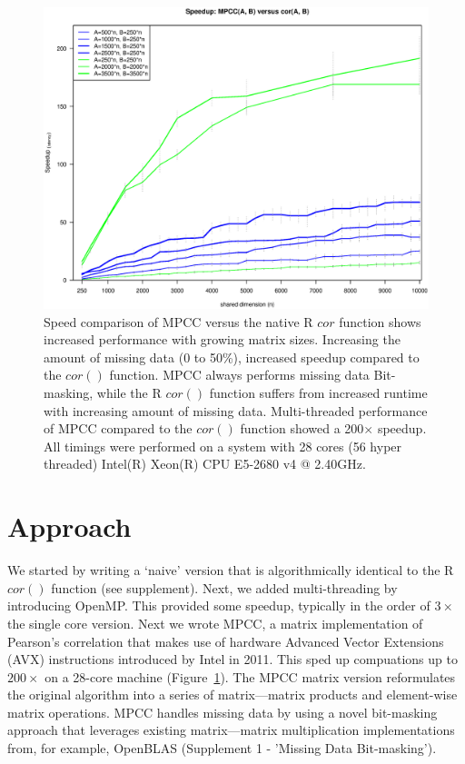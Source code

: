 \documentclass{bioinfo}
\begin{document}
\begin{figure}[H]
\centering
\includegraphics[width=\linewidth]{img/figure02new.eps}
  \caption{
  \small
    Speed comparison of MPCC versus the native R $cor$ function
    shows increased performance with growing matrix sizes. Increasing
    the amount of missing data (0 to 50\%), increased speedup compared
    to the $cor()$ function. MPCC always performs missing data Bit-masking,
    while the R $cor()$ function suffers from increased runtime with
    increasing amount of missing data. Multi-threaded performance
    of MPCC compared to the $cor()$ function showed a 200$\times$ speedup.
    All timings were performed on a system with 28 cores (56 hyper
    threaded) Intel(R) Xeon(R) CPU E5-2680 v4 @ 2.40GHz.
}
  \label{fig:fig2}
\end{figure}

\vspace*{-10mm}

\section{Approach}

We started by writing a `naive' version that is algorithmically
identical to the R $cor()$ function (see supplement). Next, we added
multi-threading by introducing OpenMP. This provided some speedup,
typically in the order of $3\times$ the single core version.  Next we
wrote MPCC, a matrix implementation of Pearson's correlation that
makes use of hardware Advanced Vector Extensions (AVX) instructions
introduced by Intel in 2011. This sped up compuations up to
$200\times$ on a 28-core machine (Figure~\ref{fig:fig2}).  The MPCC
matrix version reformulates the original algorithm into a series of
matrix---matrix products and element-wise matrix operations. MPCC
handles missing data by using a novel bit-masking approach that
leverages existing matrix---matrix multiplication implementations
from, for example, OpenBLAS (Supplement 1 - 'Missing Data
Bit-masking').
\end{document}
